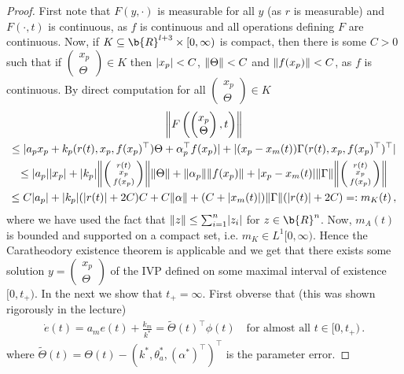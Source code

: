 \documentclass[12pt,a4paper]{article}
\DeclarePairedDelimiter{\norm}{\lVert}{\rVert}
\DeclarePairedDelimiter{\abs}{\lvert}{\rvert}
\newcommand{\mat}[1]{\left(\begin{matrix}#1\end{matrix}\right)}
\newcommand{\smat}[1]{\left(\begin{smallmatrix}#1\end{smallmatrix}\right)}
\begin{document}
\begin{proof}
		First note that $F(y,\cdot)$ is measurable for all $y$ (as $r$ is measurable) and $F(\cdot,t)$ is continuous, as $f$ is continuous and all operations defining $F$ are continuous.
		Now, if $K \subseteq \b{R}^{l+3} \times [0,\infty)$ is compact, then there is some $C>0$ such that if $\smat{x_p \\ \Theta} \in K$ then $\abs{x_p} < C$, $\norm{\Theta} < C$ and $\norm{f(x_p)} < C$, as $f$ is continuous.
		By direct computation for all $\smat{x_p \\ \Theta} \in K$
		\begin{gather*}
			\norm*{F\left(\mat{x_p \\ \Theta},t\right)} \\
			\leq \abs{a_px_p + k_p (r(t), x_p, f(x_p)^\top) \Theta  + \alpha_p^\top f(x_p)} + \abs{(x_p-x_m(t)) \Gamma (r(t), x_p, f(x_p)^\top)^\top} \\
			\leq \abs{a_p}\abs{x_p} + \abs{k_p}\norm*{\smat{r(t)\\ x_p \\ f(x_p)}}\norm{\Theta} + \norm{\alpha_p}\norm{f(x_p)} + \abs{x_p-x_m(t)}\norm{\Gamma}\norm*{\smat{r(t)\\ x_p \\ f(x_p)}} \\
			\leq C\abs{a_p}+\abs{k_p} (\abs{r(t)}+2C)C + C\norm{\alpha} + (C+\abs{x_m(t)})\norm{\Gamma}(\abs{r(t)}+2C) =: m_K(t)\,,
		\end{gather*}
		where we have used the fact that $\norm{z} \leq \sum_{i=1}^n \abs{z_i}$ for $z \in \b{R}^n$. 
		Now, $m_A(t)$ is bounded and supported on a compact set, i.e. $m_K \in L^1[0,\infty)$.
		Hence the Caratheodory existence theorem is applicable and we get that there exists some solution $y = \smat{x_p\\\Theta}$ of the IVP defined on some maximal interval of existence $[0,t_+)$.
		In the next we show that $t_+ = \infty$.
		First obverse that (this was shown rigorously in the lecture)
		\begin{align}
			\dot{e}(t) = a_m e(t) + \frac{k_m}{k^*} = \tilde{\Theta}(t)^\top \phi(t)
			\quad \text{for almost all } t \in [0,t_+)\,.
			\label{eq:errorDynamics}
		\end{align}
		where $\tilde{\Theta}(t) = \Theta(t) - (k^*,\theta_a^*,(\alpha^*)^\top)^\top$ is the parameter error.
		

\end{proof}
\end{document}
